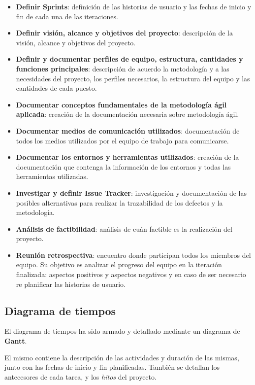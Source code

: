\begin{itemize}
    \item{\textbf{Definir Sprints}:}
    definición de las historias de usuario y las fechas de inicio y fin de cada una de las iteraciones.
    \item{\textbf{Definir visión, alcance y objetivos del proyecto}:}
    descripción de la visión, alcance y objetivos del proyecto.
    \item{\textbf{Definir y documentar perfiles de equipo, estructura, cantidades y funciones principales}:}
    descripción de acuerdo la metodología y a las necesidades del proyecto, los perfiles necesarios, la estructura del equipo y las cantidades de cada puesto.
    \item{\textbf{Documentar conceptos fundamentales de la metodología ágil aplicada}:}
    creación de la documentación necesaria sobre metodología ágil.
    \item{\textbf{Documentar medios de comunicación utilizados}:}
    documentación de todos los medios utilizados por el equipo de trabajo para comunicarse.
    \item{\textbf{Documentar los entornos y herramientas utilizados}:}
    creación de la documentación que contenga la información de los entornos y todas las herramientas utilizadas.
    \item{\textbf{Investigar y definir Issue Tracker}:}
    investigación y documentación de las posibles alternativas para realizar la trazabilidad de los defectos y la metodología.
    \item{\textbf{Análisis de factibilidad}:}
    análisis de cuán factible es la realización del proyecto.
    \item{\textbf{Reunión retrospectiva}:}
    encuentro donde participan todos los miembros del equipo.
    Su objetivo es analizar el progreso del equipo en la iteración finalizada: aspectos positivos y aspectos negativos y en caso de ser necesario re planificar las historias de usuario.
    
    
    
\end{itemize}



\subsection{Diagrama de tiempos}

El diagrama de tiempos ha sido armado y detallado mediante un diagrama de \textbf{Gantt}.

El mismo contiene la descripción de las actividades y duración de las mismas, junto con las fechas de inicio y fin planificadas. También se detallan los antecesores de cada tarea, y los \textit{hitos} del proyecto.

